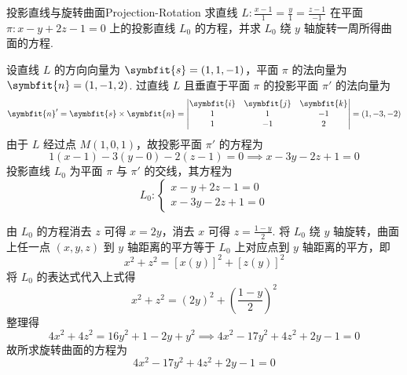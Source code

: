 \begin{problem}{投影直线与旋转曲面}{Projection-Rotation}
    求直线 $L : \frac{x-1}{1}=\frac{y}{1}=\frac{z-1}{-1}$ 在平面 $\pi : x-y+2z-1=0$ 上的投影直线 $L_0$ 的方程，并求 $L_0$ 绕 $y$ 轴旋转一周所得曲面的方程.
\end{problem}

\begin{solution}

    设直线 $L$ 的方向向量为 $\symbfit{s} = (1, 1, -1)$，平面 $\pi$ 的法向量为 $\symbfit{n} = (1, -1, 2)$.
    过直线 $L$ 且垂直于平面 $\pi$ 的投影平面 $\pi'$ 的法向量为
    \begin{equation*}
        \symbfit{n}' = \symbfit{s} \times \symbfit{n} =
        \begin{vmatrix}
            \symbfit{i} & \symbfit{j} & \symbfit{k} \\
            1           & 1           & -1          \\
            1           & -1          & 2
        \end{vmatrix} = (1, -3, -2)
    \end{equation*}
    由于 $L$ 经过点 $M(1, 0, 1)$，故投影平面 $\pi'$ 的方程为
    \begin{equation*}
        1(x-1) - 3(y-0) - 2(z-1) = 0 \implies x - 3y - 2z + 1 = 0
    \end{equation*}
    投影直线 $L_0$ 为平面 $\pi$ 与 $\pi'$ 的交线，其方程为
    \begin{equation*}
        \boxed{L_0 : \begin{cases} x - y + 2z - 1 = 0 \\ x - 3y - 2z + 1 = 0 \end{cases}}
    \end{equation*}


    由 $L_0$ 的方程消去 $z$ 可得 $x = 2y$，消去 $x$ 可得 $z = \frac{1-y}{2}$.
    将 $L_0$ 绕 $y$ 轴旋转，曲面上任一点 $(x, y, z)$ 到 $y$ 轴距离的平方等于 $L_0$ 上对应点到 $y$ 轴距离的平方，即
    \begin{equation*}
        x^2 + z^2 = [x(y)]^2 + [z(y)]^2
    \end{equation*}
    将 $L_0$ 的表达式代入上式得
    \begin{equation*}
        x^2 + z^2 = (2y)^2 + \left( \frac{1-y}{2} \right)^2
    \end{equation*}
    整理得
    \begin{equation*}
        4x^2 + 4z^2 = 16y^2 + 1 - 2y + y^2 \implies 4x^2 - 17y^2 + 4z^2 + 2y - 1 = 0
    \end{equation*}
    故所求旋转曲面的方程为
    \begin{equation*}
        \boxed{4x^2 - 17y^2 + 4z^2 + 2y - 1 = 0}
    \end{equation*}
\end{solution}


